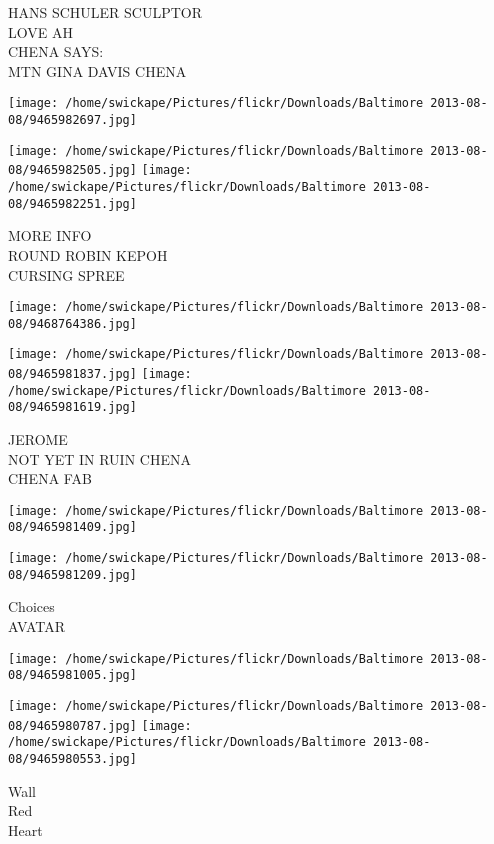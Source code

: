 \documentclass[10pt,letterpaper]{article}
\begin{document}
HANS SCHULER SCULPTOR\\
LOVE AH\\
CHENA SAYS:\\
MTN GINA DAVIS CHENA
\pagebreak

\texttt{[image: /home/swickape/Pictures/flickr/Downloads/Baltimore 2013-08-08/9465982697.jpg]}

\vspace{0.25in}
\texttt{[image: /home/swickape/Pictures/flickr/Downloads/Baltimore 2013-08-08/9465982505.jpg]}
\texttt{[image: /home/swickape/Pictures/flickr/Downloads/Baltimore 2013-08-08/9465982251.jpg]}

MORE INFO\\
ROUND ROBIN KEPOH\\
CURSING SPREE
\pagebreak

\texttt{[image: /home/swickape/Pictures/flickr/Downloads/Baltimore 2013-08-08/9468764386.jpg]}

\vspace{0.25in}
\texttt{[image: /home/swickape/Pictures/flickr/Downloads/Baltimore 2013-08-08/9465981837.jpg]}
\texttt{[image: /home/swickape/Pictures/flickr/Downloads/Baltimore 2013-08-08/9465981619.jpg]}

JEROME\\
NOT YET IN RUIN CHENA\\
CHENA FAB
\pagebreak

\texttt{[image: /home/swickape/Pictures/flickr/Downloads/Baltimore 2013-08-08/9465981409.jpg]}

\vspace{0.25in}
\texttt{[image: /home/swickape/Pictures/flickr/Downloads/Baltimore 2013-08-08/9465981209.jpg]}

Choices\\
AVATAR
\pagebreak

\texttt{[image: /home/swickape/Pictures/flickr/Downloads/Baltimore 2013-08-08/9465981005.jpg]}

\vspace{0.25in}
\texttt{[image: /home/swickape/Pictures/flickr/Downloads/Baltimore 2013-08-08/9465980787.jpg]}
\texttt{[image: /home/swickape/Pictures/flickr/Downloads/Baltimore 2013-08-08/9465980553.jpg]}

Wall\\
Red\\
Heart
\pagebreak
\end{document}
